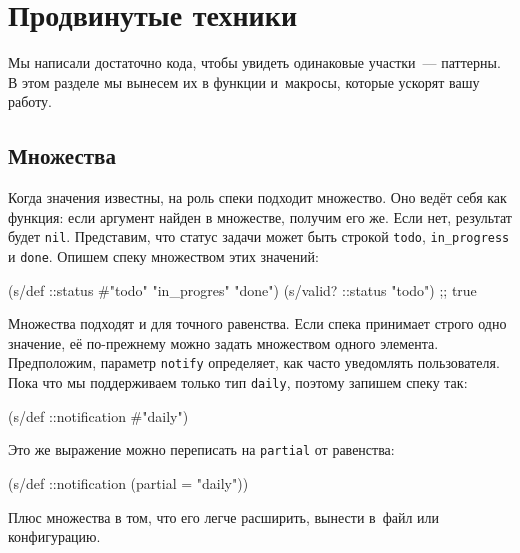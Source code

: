 \section{Продвинутые техники}


Мы написали достаточно кода, чтобы увидеть одинаковые участки~--- паттерны. В
этом разделе мы вынесем их в функции и~макросы, которые ускорят вашу работу.

\subsection{Множества}


Когда значения известны, на роль спеки подходит множество. Оно ведёт себя как
функция: если аргумент найден в множестве, получим его же. Если нет, результат
будет \verb|nil|. Представим, что статус задачи может быть строкой
\verb|todo|, \verb|in_progress| и \verb|done|. Опишем спеку множеством
этих значений:

\begin{english}
  \begin{clojure}
(s/def ::status #{"todo" "in_progres" "done"})
(s/valid? ::status "todo") ;; true
  \end{clojure}
\end{english}

Множества подходят и для точного равенства. Если спека принимает строго одно
значение, её по-прежнему можно задать множеством одного
элемента. Предположим, параметр \verb|notify| определяет, как часто уведомлять
пользователя. Пока что мы поддерживаем только тип \verb|daily|, поэтому
запишем спеку так:

\begin{english}
  \begin{clojure}
(s/def ::notification #{"daily"})
  \end{clojure}
\end{english}

\noindent
Это же выражение можно переписать на \verb|partial| от равенства:

\begin{english}
  \begin{clojure}
(s/def ::notification (partial = "daily"))
  \end{clojure}
\end{english}

Плюс множества в том, что его легче расширить, вынести в~файл или конфигурацию.

